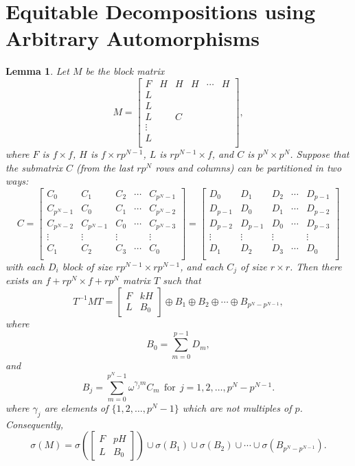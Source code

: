 \documentclass[preprint,12pt]{elsarticle}
\newtheorem{lem}[thm]{Lemma}
\theoremstyle{definition}
\theoremstyle{remark}
\begin{document}
\section{Equitable Decompositions using Arbitrary Automorphisms}
\begin{lem}\label{lem:Dallas}
Let $M$ be the block matrix
\begin{equation}\label{eq:circulant}
M = \left[\begin{array}{llllll}
F & H & H & H & \cdots & H \\
L &  \\
L &  \\
L &  & C \\
\vdots &  \\
L &  \\
\end{array}\right],
\end{equation}
where $F$ is $f \times f$, $H$ is $f \times rp^{N-1}$,  $L$ is $rp^{N-1} \times f$, and $C$ is $p^N \times p^N$.  Suppose that the submatrix $C$ (from the last $rp^N$ rows and columns) can be partitioned in two ways:
\[
C =  \left[\begin{array}{lllll}
 C_0 & C_1 & C_2 & \cdots & C_{p^N-1} \\
 C_{p^N-1} & C_0 & C_1 & \cdots & C_{p^N-2} \\
 C_{p^N-2} & C_{p^N-1} & C_0 & \cdots & C_{p^N-3} \\
 \vdots & \vdots & \vdots & & \vdots \\
 C_1 & C_2 & C_3 & \cdots & C_0 \\
\end{array}\right] =
\left[\begin{array}{lllll}
 D_0 & D_1 & D_2 & \cdots & D_{p-1} \\
 D_{p-1} & D_0 & D_1 & \cdots & D_{p-2} \\
 D_{p-2} & D_{p-1} & D_0 & \cdots & D_{p-3} \\
 \vdots & \vdots & \vdots & & \vdots \\
 D_1 & D_2 & D_3 & \cdots & D_0 \\
\end{array}\right]
\]
with each $D_i$ block of size $rp^{N-1} \times rp^{N-1}$, and each $C_j$ of size $r \times r$.
  Then there exists an $f + rp^{N} \times f  +rp^N$ matrix $T$ such that
\[
T^{-1} M T = \left[\begin{array}{rr} F & kH \\ L & B_0 \end{array}\right]
\oplus B_1 \oplus B_2 \oplus \cdots \oplus B_{p^N-p^{N-1}},
\]
where
\[
B_0 = \sum_{m=0}^{p-1} D_m,
\]
and
\[
B_j = \sum_{m=0}^{p^N-1} \omega^{\gamma_j m}C_m \ \ \text{for} \ \ j = 1,2, \ldots, p^N-p^{N-1}.
\]
where $\gamma_j$ are elements of $\{1,2,\dots ,p^N-1\}$ which are not multiples of $p$. Consequently,
\[
\sigma(M) = \sigma\left(\left[\begin{array}{rr} F & pH \\ L & B_0 \end{array}\right] \right)
\cup \sigma(B_1) \cup \sigma(B_2) \cup \cdots \cup \sigma(B_{p^N-p^{N-1}}).
\]
\end{lem}
\end{document}
